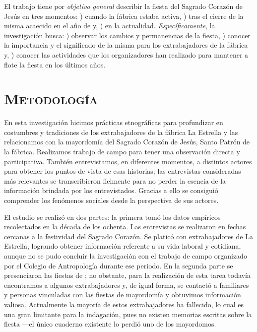 \documentclass[14pt,letterpaper,twoside]{extbook} %
\begin{document}
\noindent El trabajo tiene por \textit{objetivo general} describir la fiesta del Sagrado Corazón de Jesús en tres momentos: ) cuando la fábrica estaba activa, ) tras el cierre de la misma acaecido en el año de  y, ) en la actualidad. \textit{Específicamente}, la investigación busca: ) observar los cambios y permanencias de la fiesta, ) conocer la importancia y el significado de la misma para los extrabajadores de la fábrica y, ) conocer las actividades que los organizadores han realizado para mantener a flote la fiesta en los últimos años.

\section*{\mdseries\large\textsc{Metodología}}

\noindent En esta investigación hicimos prácticas etnográficas para profundizar en costumbres y tradiciones de los extrabajadores de la fábrica La Estrella y las relacionamos con la mayordomía del Sagrado Corazón de Jesús, Santo Patrón de la fábrica. Realizamos trabajo de campo para tener una observación directa y participativa. También entrevistamos, en diferentes momentos, a distintos actores para obtener los puntos de vista de esas historias; las entrevistas consideradas más relevantes se transcribieron fielmente para no perder la esencia de la información brindada por los entrevistados. Gracias a ello se consiguió comprender los fenómenos sociales desde la perspectiva de sus actores.

El estudio se realizó en dos partes: la primera tomó los datos empíricos recolectados en la década de los ochenta. Las entrevistas se realizaron en fechas cercanas a la festividad del Sagrado Corazón. Se platicó con extrabajadores de La Estrella, logrando obtener información referente a su vida laboral y cotidiana, aunque no se pudo concluir la investigación con el trabajo de campo organizado por el Colegio de Antropología durante ese periodo. En la segunda parte se presenciaron las fiestas de ; no obstante, para la realización de esta tarea todavía encontramos a algunos extrabajadores y, de igual forma, se contactó a familiares y personas vinculadas con las fiestas de mayordomía y obtuvimos información valiosa. Actualmente la mayoría de estos extrabajadores ha fallecido, lo cual es una gran limitante para la indagación, pues no existen memorias escritas sobre la fiesta ---el único cuaderno existente lo perdió uno de los mayordomos.
\end{document}
